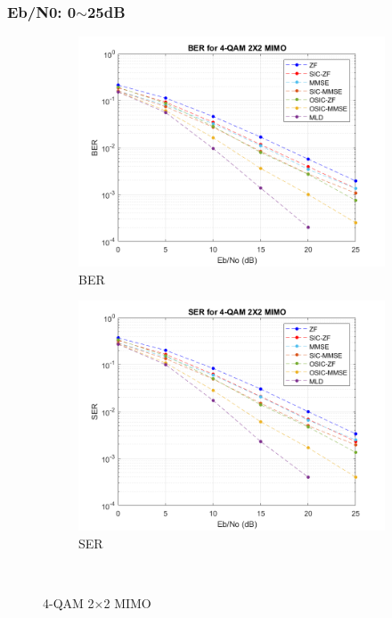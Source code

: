 \documentclass{article}
\begin{document}
\subsubsection{Eb/N0: 0$\sim$25dB}
\begin{figure}[H]
	\centering
	\begin{subfigure}{0.5\textwidth}
		\centerline{\includegraphics[width=1\textwidth]{BER_2x2_4qam2.png}}
		\caption{BER}
	\end{subfigure}%
	\begin{subfigure}{0.5\textwidth}
		\centerline{\includegraphics[width=1\textwidth]{SER_2x2_4qam2.png}}
		\caption{SER}
	\end{subfigure}\\%
	\caption{4-QAM 2$\times$2 MIMO}
\end{figure}
\end{document}
